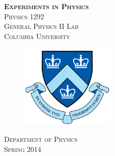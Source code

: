 \begin{titlepage}
\begin{center}
\textsc{\Huge\bf Experiments in Physics}
\\[5cm]
\textsc{\huge Physics 1292}
\\[0.3cm]
\textsc{\huge General Physics II Lab}
\\[4cm]
\textsc{\large Columbia University}
\\[0.5cm]
\begin{figure}[h]
  \centering
  \includegraphics[height=4cm]{./pic/Columbia-Logo.png}
\end{figure}
\textsc{Department of Physics}
\\[1cm]
\textsc{Spring 2014}
\end{center}
\end{titlepage}
